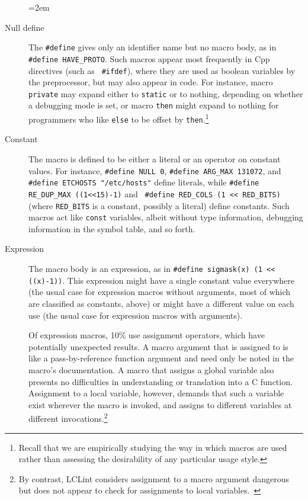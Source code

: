\documentclass[11pt]{article}
\begin{document}
\begin{description}
  \sloppy
  \emergencystretch=2em

\item[Null define]  The {\tt \#define} gives only an
  identifier name but no macro body, as in {\tt \#define \verb|HAVE_PROTO|}.
  Such macros appear most frequently in Cpp directives (such as {\tt
  \#ifdef}), where they are used as boolean variables by the preprocessor,
but may also appear in code.  For instance, macro {\tt private} may expand
either to {\tt static} or to nothing, depending on whether a debugging mode
is set, or macro {\tt then} might expand to nothing for programmers who
like {\tt else} to be offset by {\tt then}.\footnote{Recall that we are
  empirically studying the way in which macros are used rather than
  assessing the desirability of any particular usage style.}

\item[Constant] The macro is defined to be either a literal or an operator
  on constant values.  For instance, {\tt \#define NULL 0}, {\tt \#define
  \verb|ARG_MAX| 131072}, and {\tt \#define ETCHOSTS "/etc/hosts"} define
literals, while {\tt \#define \verb|RE_DUP_MAX| ((1<<15)-1)} and {\tt
\#define \verb|RED_COLS| (1 << \verb|RED_BITS|)} (where \verb|RED_BITS| is
a constant, possibly a literal) define constants.  Such macros act like
{\tt const} variables, albeit without type information, debugging
information in the symbol table, and so forth.

\item[Expression]  The macro body is an expression, as in {\tt \#define
  sigmask(x) (1 << ((x)-1))}.  This expression might have a single constant
value everywhere (the usual case for expression macros without arguments,
most of which are classified as constants, above) or might have a
different value on each use (the usual case for expression macros with
arguments).

Of expression macros, 10\% use assignment operators, which have potentially
unexpected results.  A macro argument that is assigned to is like a
pass-by-reference function argument and need only be noted in the macro's
documentation.  A macro that assigns a global variable also presents no
difficulties in understanding or translation into a C function.  Assignment
to a local variable, however, demands that such a variable exist wherever
the macro is invoked, and assigns to different variables at different
invocations.\footnote{By contrast, LCLint considers assignment to a macro
  argument dangerous but does not appear to check for assignments to local
  variables.~\cite{Evans:LCLint}}


\end{description}
\end{document}
